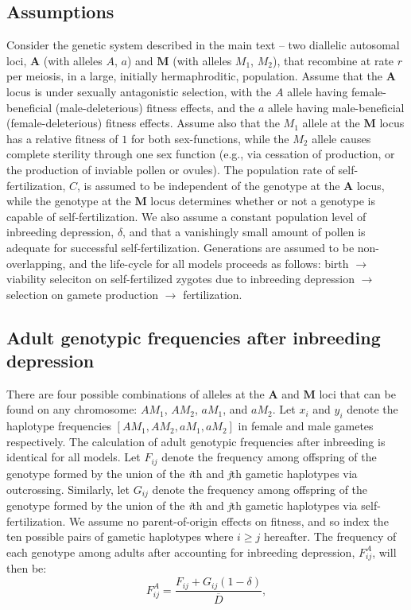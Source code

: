 \documentclass{article}
\begin{document}
\subsection*{Assumptions}

Consider the genetic system described in the main text -- two diallelic autosomal loci, $\mathbf{A}$ (with alleles $A$, $a$) and $\mathbf{M}$ (with alleles $M_1$, $M_2$), that recombine at rate $r$ per meiosis, in a large, initially hermaphroditic, population. Assume that the $\mathbf{A}$ locus is under sexually antagonistic selection, with the $A$ allele having female-beneficial (male-deleterious) fitness effects, and the $a$ allele having male-beneficial (female-deleterious) fitness effects. Assume also that the $M_1$ allele at the $\mathbf{M}$ locus has a relative fitness of $1$ for both sex-functions, while the $M_2$ allele causes complete sterility through one sex function (e.g., via cessation of production, or the production of inviable pollen or ovules). The population rate of self-fertilization, $C$, is assumed to be independent of the genotype at the $\mathbf{A}$ locus, while the genotype at the $\mathbf{M}$ locus determines whether or not a genotype is capable of self-fertilization. We also assume a constant population level of inbreeding depression, $\delta$, and that a vanishingly small amount of pollen is adequate for successful self-fertilization. Generations are assumed to be non-overlapping, and the life-cycle for all models proceeds as follows: birth $\rightarrow$ viability seleciton on self-fertilized zygotes due to inbreeding depression $\rightarrow$ selection on gamete production $\rightarrow$ fertilization.

\subsection*{Adult genotypic frequencies after inbreeding depression}

There are four possible combinations of alleles at the $\mathbf{A}$ and $\mathbf{M}$ loci that can be found on any chromosome: $A M_1$, $A M_2$, $a M_1$, and $a M_2$. Let $x_i$ and $y_i$ denote the haplotype frequencies $[AM_1,AM_2,aM_1,aM_2]$ in female and male gametes respectively. The calculation of adult genotypic frequencies after inbreeding is identical for all models. Let $F_{ij}$ denote the frequency among offspring of the genotype formed by the union of the \textit{i}th and \textit{j}th gametic haplotypes via outcrossing. Similarly, let $G_{ij}$ denote the frequency among offspring of the genotype formed by the union of the \textit{i}th and \textit{j}th gametic haplotypes via self-fertilization. We assume no parent-of-origin effects on fitness, and so index the ten possible pairs of gametic haplotypes where $i \geq j$ hereafter. The frequency of each genotype among adults after accounting for inbreeding depression, $F^A_{ij}$, will then be:
\begin{equation} \label{eq:AdultFreq}
	F^A_{ij} = \frac{F_{ij} + G_{ij}(1 - \delta)}{\overline{D}},
\end{equation}
\end{document}
